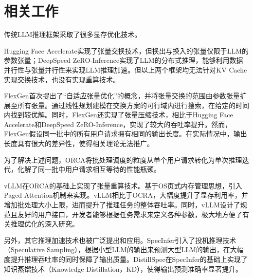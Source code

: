 \section{相关工作}

传统LLM推理框架采取了很多显存优化技术。 \par

Hugging Face Accelerate\cite{Huggingface-Accelerate}实现了张量交换技术，但换出与换入的张量仅限于LLM的参数张量；DeepSpeed ZeRO-Inference\cite{GPT-175B资源消耗}实现了LLM的分布式推理，能够利用数据并行性与张量并行性来实现LLM推理加速。但以上两个框架均无法针对KV Cache实现交换技术，也没有实现重算技术。 \par

FlexGen\cite{Swapping}首次提出了“自适应张量优化”的概念，并将张量交换的范围由参数张量扩展至所有张量。通过线性规划建模在交换方案的可行域内进行搜索，在给定的时间内找到较优解。同时，FlexGen还实现了张量压缩技术，相比于Hugging Face Accelerate和DeepSpeed ZeRO-Inference，实现了较大的吞吐率提升。然而，FlexGen假设同一批中的所有用户请求拥有相同的输出长度。在实际情况中，输出长度具有很大的差异性，使得相关理论无法推广。\par

为了解决上述问题，ORCA\cite{ORCA}将批处理调度的粒度从单个用户请求转化为单次推理迭代，化解了同一批中用户请求相互等待的性能瓶颈。 \par

vLLM\cite{vLLM}在ORCA的基础上实现了张量重算技术。基于OS页式内存管理思想，引入Paged Attention机制来实现。vLLM相比于OCRA，大幅度提升了显存利用率，并增加批处理大小上限，进而提升了推理任务的整体吞吐率。同时，vLLM设计了规范且友好的用户接口，开发者能够根据任务需求来定义各种参数，极大地方便了有关推理优化的深入研究。 \par

另外，其它推理加速技术也被广泛提出和应用。SpecInfer\cite{SpecInfer}引入了投机推理技术（Speculative Sampling），根据小型LLM的输出来预测大型LLM的输出，在大幅度提升推理吞吐率的同时保障了输出质量。DistillSpec\cite{DistillSpec}在SpecInfer的基础上实现了知识蒸馏技术（Knowledge Distillation，KD），使得输出预测准确率显著提升。